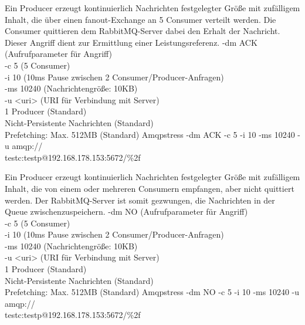 \documentclass[	a4paper,
			11pt,
			oneside,
			parskip]{scrartcl}
\begin{document}
		{%
		 Ein Producer erzeugt kontinuierlich Nachrichten festgelegter Größe mit zufälligem Inhalt, die über einen \glqq fanout\grqq-Exchange an 5 Consumer verteilt werden. Die Consumer quittieren dem RabbitMQ-Server dabei den Erhalt der Nachricht. 
		 Dieser Angriff dient zur Ermittlung einer Leistungsreferenz.
		}{%
		 -dm ACK (Aufrufparameter für Angriff) \\
		 -c 5 (5 Consumer) \\
		 -i 10 (10ms Pause zwischen 2 Consumer/Producer-Anfragen) \\
		 -ms 10240 (Nachrichtengröße: 10KB) \\
		 -u <uri> (URI für Verbindung mit Server) \\
		 1 Producer (Standard) \\
		 Nicht-Persistente Nachrichten (Standard) \\
		 Prefetching: Max. 512MB (Standard)
		}{%
		 Amqpstress -dm ACK -c 5 -i 10 -ms 10240 -u amqp://\\\hspace*{3cm}testc:testp@192.168.178.153:5672/\%2f
		}


		{%
		 Ein Producer erzeugt kontinuierlich Nachrichten festgelegter Größe mit zufälligem Inhalt, die von einem oder mehreren Consumern empfangen, aber nicht quittiert werden.
		 Der RabbitMQ-Server ist somit gezwungen, die Nachrichten in der Queue zwischenzuspeichern.
		}{%
		 -dm NO (Aufrufparameter für Angriff) \\
		 -c 5 (5 Consumer) \\
		 -i 10 (10ms Pause zwischen 2 Consumer/Producer-Anfragen) \\
		 -ms 10240 (Nachrichtengröße: 10KB) \\
		 -u <uri> (URI für Verbindung mit Server) \\
		 1 Producer (Standard) \\
		 Nicht-Persistente Nachrichten (Standard) \\
		 Prefetching: Max. 512MB (Standard) 
		}{%
		 Amqpstress -dm NO -c 5 -i 10 -ms 10240 -u amqp://\\\hspace*{3cm}testc:testp@192.168.178.153:5672/\%2f
		}
\end{document}
